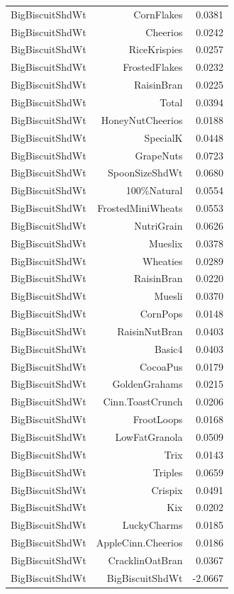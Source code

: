\begin{longtable}{@{}lrr@{}}
BigBiscuitShdWt & CornFlakes & 0.0381 \\
BigBiscuitShdWt & Cheerios & 0.0242 \\
BigBiscuitShdWt & RiceKrispies & 0.0257 \\
BigBiscuitShdWt & FrostedFlakes & 0.0232 \\
BigBiscuitShdWt & RaisinBran & 0.0225 \\
BigBiscuitShdWt & Total & 0.0394 \\
BigBiscuitShdWt & HoneyNutCheerios & 0.0188 \\
BigBiscuitShdWt & SpecialK & 0.0448 \\
BigBiscuitShdWt & GrapeNuts & 0.0723 \\
BigBiscuitShdWt & SpoonSizeShdWt & 0.0680 \\
BigBiscuitShdWt & 100\%Natural & 0.0554 \\
BigBiscuitShdWt & FrostedMiniWheats & 0.0553 \\
BigBiscuitShdWt & NutriGrain & 0.0626 \\
BigBiscuitShdWt & Mueslix & 0.0378 \\
BigBiscuitShdWt & Wheaties & 0.0289 \\
BigBiscuitShdWt & RaisinBran & 0.0220 \\
BigBiscuitShdWt & Muesli & 0.0370 \\
BigBiscuitShdWt & CornPops & 0.0148 \\
BigBiscuitShdWt & RaisinNutBran & 0.0403 \\
BigBiscuitShdWt & Basic4 & 0.0403 \\
BigBiscuitShdWt & CocoaPus & 0.0179 \\
BigBiscuitShdWt & GoldenGrahams & 0.0215 \\
BigBiscuitShdWt & Cinn.ToastCrunch & 0.0206 \\
BigBiscuitShdWt & FrootLoops & 0.0168 \\
BigBiscuitShdWt & LowFatGranola & 0.0509 \\
BigBiscuitShdWt & Trix & 0.0143 \\
BigBiscuitShdWt & Triples & 0.0659 \\
BigBiscuitShdWt & Crispix & 0.0491 \\
BigBiscuitShdWt & Kix & 0.0202 \\
BigBiscuitShdWt & LuckyCharms & 0.0185 \\
BigBiscuitShdWt & AppleCinn.Cheerios & 0.0186 \\
BigBiscuitShdWt & CracklinOatBran & 0.0367 \\
BigBiscuitShdWt & BigBiscuitShdWt & -2.0667 \\

\end{longtable}
